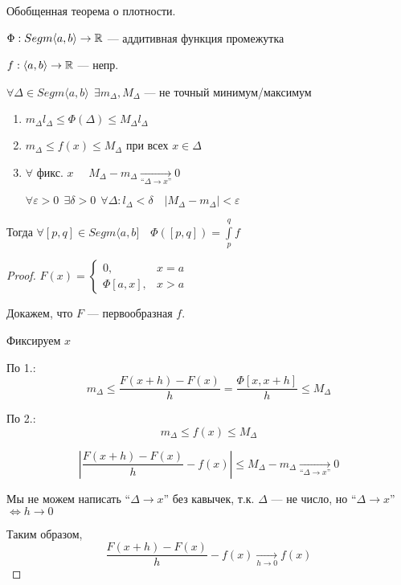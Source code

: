 

\cfoot{}



\begin{theorem}
    Обобщенная теорема о плотности.

    $\Phi:Segm\langle a,b\rangle\to\mathbb{R}$ --- аддитивная функция промежутка

    $f:\langle a,b\rangle\to\mathbb{R}$ --- непр.

    $\forall \Delta\in Segm\langle a,b\rangle\ \ \exists m_\Delta, M_\Delta$ --- не точный минимум/максимум

    \begin{enumerate}
        \item $m_\Delta l_\Delta\leq \Phi(\Delta)\leq M_\Delta l_\Delta$
        \item $m_\Delta\leq f(x)\leq M_\Delta$ при всех $x\in\Delta$
        \item $\forall$ фикс. $x\quad$ $M_\Delta-m_\Delta\xrightarrow[\text{``}\Delta\to x\text{''}]{} 0$
        
        $\forall \varepsilon>0 \ \ \exists \delta>0 \ \ \forall \Delta: l_\Delta<\delta \quad |M_\Delta-m_\Delta|<\varepsilon$
    \end{enumerate}

    Тогда $\forall [p,q]\in Segm\langle a,b] \quad \Phi([p,q])=\int\limits_p^q f$
\end{theorem}
\begin{proof}
    $F(x)=\begin{cases}
        0, & x=a \\
        \Phi[a,x], & x>a
    \end{cases}$

    Докажем, что $F$ --- первообразная $f$.

    Фиксируем $x$

    По 1.:
    $$m_\Delta\leq\frac{F(x+h)-F(x)}{h}=\frac{\Phi[x,x+h]}{h}\leq M_\Delta$$

    По 2.:
    $$m_\Delta\leq f(x)\leq M_\Delta$$

    $$\left|\frac{F(x+h)-F(x)}{h}-f(x)\right|\leq M_\Delta-m_\Delta\xrightarrow[\text{``}\Delta\to x\text{''}]{}0$$

    Мы не можем написать ``$\Delta\to x$'' без кавычек, т.к. $\Delta$ --- не число, но ``$\Delta\to x$''$\Leftrightarrow h\to0$

    Таким образом, $$\frac{F(x+h)-F(x)}{h}-f(x)\xrightarrow[h\to0]{}f(x)$$
\end{proof}

